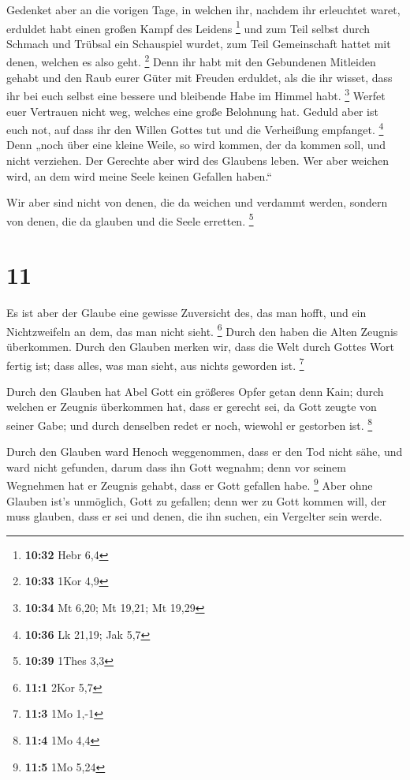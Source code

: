  Gedenket aber an die vorigen Tage, in welchen ihr, nachdem
ihr erleuchtet waret, erduldet habt einen großen Kampf des Leidens
\footnote{\textbf{10:32} Hebr 6,4}  und zum Teil selbst
durch Schmach und Trübsal ein Schauspiel wurdet, zum Teil Gemeinschaft
hattet mit denen, welchen es also geht. \footnote{\textbf{10:33} 1Kor
  4,9}  Denn ihr habt mit den Gebundenen Mitleiden gehabt
und den Raub eurer Güter mit Freuden erduldet, als die ihr wisset, dass
ihr bei euch selbst eine bessere und bleibende Habe im Himmel habt.
\footnote{\textbf{10:34} Mt 6,20; Mt 19,21; Mt 19,29} 
Werfet euer Vertrauen nicht weg, welches eine große Belohnung hat.
 Geduld aber ist euch not, auf dass ihr den Willen Gottes
tut und die Verheißung empfanget. \footnote{\textbf{10:36} Lk 21,19; Jak
  5,7}  Denn „noch über eine kleine Weile, so wird kommen,
der da kommen soll, und nicht verziehen.  Der Gerechte aber
wird des Glaubens leben. Wer aber weichen wird, an dem wird meine Seele
keinen Gefallen haben.``

 Wir aber sind nicht von denen, die da weichen und verdammt
werden, sondern von denen, die da glauben und die Seele erretten.
\footnote{\textbf{10:39} 1Thes 3,3}

\hypertarget{section-5}{%
\section{11}\label{section-5}}

 Es ist aber der Glaube eine gewisse Zuversicht des, das man
hofft, und ein Nichtzweifeln an dem, das man nicht sieht. \footnote{\textbf{11:1}
  2Kor 5,7}  Durch den haben die Alten Zeugnis überkommen.
 Durch den Glauben merken wir, dass die Welt durch Gottes
Wort fertig ist; dass alles, was man sieht, aus nichts geworden ist.
\footnote{\textbf{11:3} 1Mo 1,-1}

 Durch den Glauben hat Abel Gott ein größeres Opfer getan
denn Kain; durch welchen er Zeugnis überkommen hat, dass er gerecht sei,
da Gott zeugte von seiner Gabe; und durch denselben redet er noch,
wiewohl er gestorben ist. \footnote{\textbf{11:4} 1Mo 4,4}

 Durch den Glauben ward Henoch weggenommen, dass er den Tod
nicht sähe, und ward nicht gefunden, darum dass ihn Gott wegnahm; denn
vor seinem Wegnehmen hat er Zeugnis gehabt, dass er Gott gefallen habe.
\footnote{\textbf{11:5} 1Mo 5,24}  Aber ohne Glauben ist's
unmöglich, Gott zu gefallen; denn wer zu Gott kommen will, der muss
glauben, dass er sei und denen, die ihn suchen, ein Vergelter sein
werde.

